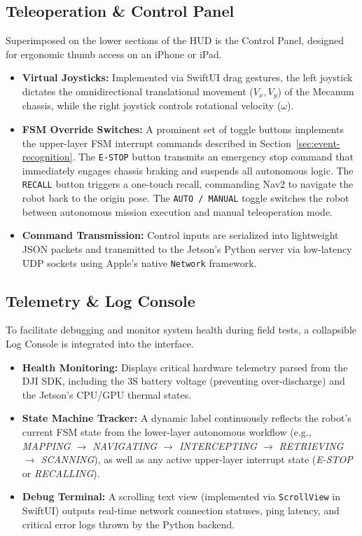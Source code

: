 \subsection{Teleoperation \& Control Panel}
\label{sec:window}
Superimposed on the lower sections of the HUD is the Control Panel, designed for ergonomic thumb access on an iPhone or iPad.

\begin{itemize}
  \item \textbf{Virtual Joysticks:} Implemented via SwiftUI drag gestures, the left joystick dictates the omnidirectional translational movement ($V_x, V_y$) of the Mecanum chassis, while the right joystick controls rotational velocity ($\omega$). 

  \item \textbf{FSM Override Switches:} A prominent set of toggle buttons implements the upper-layer FSM interrupt commands described in Section~\ref{sec:event-recognition}. The \texttt{E-STOP} button transmits an emergency stop command that immediately engages chassis braking and suspends all autonomous logic. The \texttt{RECALL} button triggers a one-touch recall, commanding Nav2 to navigate the robot back to the origin pose. The \texttt{AUTO / MANUAL} toggle switches the robot between autonomous mission execution and manual teleoperation mode.

  \item \textbf{Command Transmission:} Control inputs are serialized into lightweight JSON packets and transmitted to the Jetson's Python server via low-latency UDP sockets using Apple's native \texttt{Network} framework.
\end{itemize}


\subsection{Telemetry \& Log Console}
\label{sec:log-window}
To facilitate debugging and monitor system health during field tests, a collapsible Log Console is integrated into the interface.

\begin{itemize}
  \item \textbf{Health Monitoring:} Displays critical hardware telemetry parsed from the DJI SDK, including the 3S battery voltage (preventing over-discharge) and the Jetson's CPU/GPU thermal states.

  \item \textbf{State Machine Tracker:} A dynamic label continuously reflects the robot's current FSM state from the lower-layer autonomous workflow (e.g., \textit{MAPPING $\rightarrow$ NAVIGATING $\rightarrow$ INTERCEPTING $\rightarrow$ RETRIEVING $\rightarrow$ SCANNING}), as well as any active upper-layer interrupt state (\textit{E-STOP} or \textit{RECALLING}).

  \item \textbf{Debug Terminal:} A scrolling text view (implemented via \texttt{ScrollView} in SwiftUI) outputs real-time network connection statuses, ping latency, and critical error logs thrown by the Python backend.
\end{itemize}